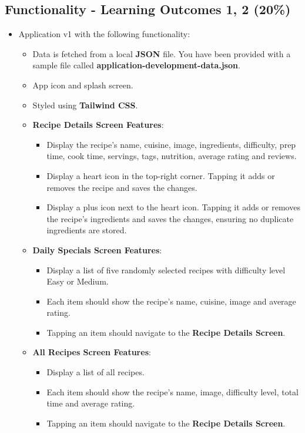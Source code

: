 \documentclass{article}
\begin{document}
\subsection*{Functionality - Learning Outcomes 1, 2 (20\%)}
\begin{itemize}
	 \item Application v1 with the following functionality:
   \begin{itemize}
    \item Data is fetched from a local \textbf{JSON} file. You have been provided with a sample file called \textbf{application-development-data.json}.
    \item App icon and splash screen.
    \item Styled using \textbf{Tailwind CSS}.

    \item \textbf{Recipe Details Screen Features}:
    \begin{itemize}
      \item Display the recipe's name, cuisine, image, ingredients, difficulty, prep time, cook time, servings, tags, nutrition, average rating and reviews.
      \item Display a heart icon in the top-right corner. Tapping it adds or removes the recipe and saves the changes.
      \item Display a plus icon next to the heart icon. Tapping it adds or removes the recipe's ingredients and saves the changes, ensuring no duplicate ingredients are stored.
    \end{itemize}

    \item \textbf{Daily Specials Screen Features}:
    \begin{itemize}
      \item Display a list of five randomly selected recipes with difficulty level Easy or Medium.
      \item Each item should show the recipe's name, cuisine, image and average rating.
      \item Tapping an item should navigate to the \textbf{Recipe Details Screen}.
    \end{itemize}

    \item \textbf{All Recipes Screen Features}:
    \begin{itemize}
      \item Display a list of all recipes.
      \item Each item should show the recipe's name, image, difficulty level, total time and average rating.
      \item Tapping an item should navigate to the \textbf{Recipe Details Screen}.
    \end{itemize}


\end{itemize}
\end{itemize}
\end{document}
